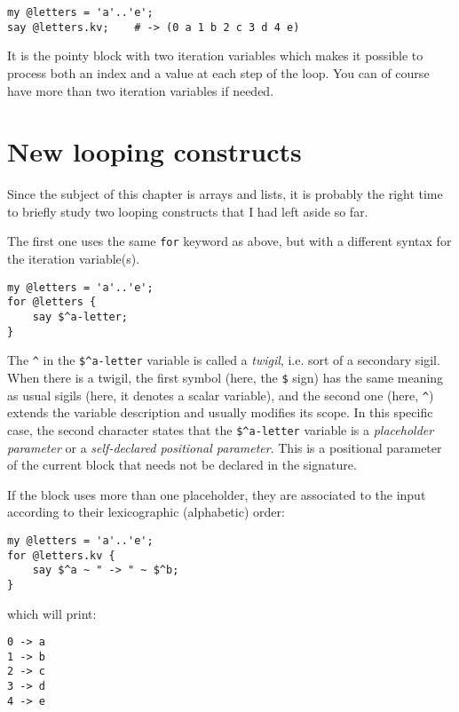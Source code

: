 \begin{verbatim}
my @letters = 'a'..'e';
say @letters.kv;    # -> (0 a 1 b 2 c 3 d 4 e)
\end{verbatim}

It is the pointy block with two iteration variables 
which makes it possible to process both an index and a value at each step of the loop. You can of course have more than two iteration variables if needed.


\section{New looping constructs}

Since the subject of this chapter is arrays and lists, 
it is probably the right time to briefly study two 
looping constructs that I had left aside so far.

The first one uses the same {\tt for} keyword as above, 
but with a different syntax for the iteration variable(s).

\begin{verbatim}
my @letters = 'a'..'e';
for @letters { 
    say $^a-letter; 
}
\end{verbatim}

The \verb'^' in the \verb'$^a-letter' variable is called 
a \emph{twigil}, i.e. sort of a secondary sigil. When there is 
a twigil, the first symbol (here, the \verb'$' sign) has the 
same meaning as usual sigils (here, it denotes a scalar variable), 
and the second one (here, \verb'^') extends the variable 
description and usually modifies its scope. In this specific 
case, the second character states that the \verb'$^a-letter' 
variable is a  \emph{placeholder parameter} or a 
\emph{self-declared positional parameter}. This is a positional 
parameter of the current block that needs not be declared in 
the signature.

If the block uses more than one placeholder, they are 
associated to the input according to their lexicographic 
(alphabetic) order:

\begin{verbatim}
my @letters = 'a'..'e';
for @letters.kv { 
    say $^a ~ " -> " ~ $^b; 
}
\end{verbatim}
%
which will print:
\begin{verbatim}
0 -> a
1 -> b
2 -> c
3 -> d
4 -> e
\end{verbatim}
%

